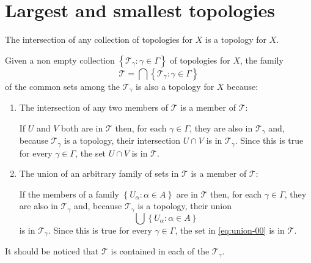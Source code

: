 \section{Largest and smallest topologies}

\begin{problem}
  The intersection of any collection of topologies for \(X\) is a topology for
  \(X\).
  \label{problem:the-intersection-of-topologies-is-again-a-topology}
\end{problem}

\begin{solution}
  Given a non empty collection
  \(\left\{\mathcal{T}_{\gamma}:\gamma\in\Gamma\right\}\) of topologies for
  \(X\), the family
  \[
    \mathcal{T}=\bigcap\left\{\mathcal{T}_{\gamma}:\gamma\in\Gamma\right\}
  \]
  of the common sets among the \(\mathcal{T}_{\gamma}\) is also a topology for
  \(X\) because:
  \begin{enumerate}
    \item
      The intersection of any two members of \(\mathcal{T}\) is a member of
      \(\mathcal{T}\):

      If \(U\) and \(V\) both are in \(\mathcal{T}\) then, for each
      \(\gamma\in\Gamma\), they are also in \(\mathcal{T}_{\gamma}\) and,
      because \(\mathcal{T}_{\gamma}\) is a topology, their intersection
      \(U\cap{V}\) is in \(\mathcal{T}_{\gamma}\). Since this is true for every
      \(\gamma\in\Gamma\), the set \(U\cap{V}\) is in \(\mathcal{T}\).

    \item
      The union of an arbitrary family of sets in \(\mathcal{T}\) is a member
      of \(\mathcal{T}\):

      If the members of a family \(\left\{U_{\alpha}:\alpha\in{A}\right\}\) are
      in \(\mathcal{T}\) then, for each \(\gamma\in\Gamma\), they are also in
      \(\mathcal{T}_{\gamma}\) and, because \(\mathcal{T}_{\gamma}\) is a
      topology, their union
      \begin{equation}
        \bigcup\left\{U_{\alpha}:\alpha\in{A}\right\}
        \label{eq:union-00}
      \end{equation}
      is in \(\mathcal{T}_{\gamma}\). Since this is true for every
      \(\gamma\in\Gamma\), the set in \eqref{eq:union-00} is in
      \(\mathcal{T}\).

  \end{enumerate}
  It should be noticed that \(\mathcal{T}\) is contained in each of the
  \(\mathcal{T}_{\gamma}\).
\end{solution}

